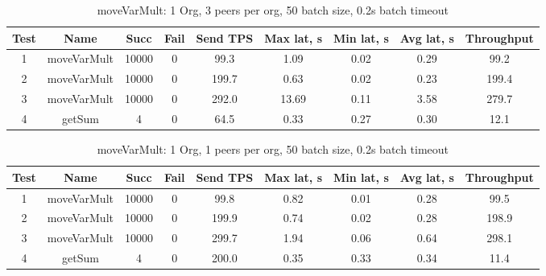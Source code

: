 \begin{appendices}
\begin{table}[H]
\begin{center}
\begin{tabular}{ |c|c|c|c|c|c|c|c|c| }
 \hline
  Test & Name & Succ  & Fail & Send TPS & Max lat, s & Min lat, s & Avg lat, s & Throughput \\
 \hline
 \hline
 1    & moveVarMult & 10000 & 0    & 99.3  & 1.09      & 0.02      & 0.29      & 99.2   \\
 \hline
 2    & moveVarMult & 10000 & 0    & 199.7 & 0.63      & 0.02      & 0.23      & 199.4  \\
 \hline
 3    & moveVarMult & 10000 & 0    & 292.0 & 13.69     & 0.11      & 3.58      & 279.7  \\
 \hline
 4    & getSum      & 4     & 0    & 64.5  & 0.33      & 0.27      & 0.30      & 12.1   \\
 \hline
\end{tabular}
\end{center}
\caption{moveVarMult: 1 Org, 3 peers per org, 50 batch size, 0.2s batch timeout}
\end{table}

\begin{table}[H]
\begin{center}
\begin{tabular}{ |c|c|c|c|c|c|c|c|c| }
 \hline
  Test & Name & Succ  & Fail & Send TPS & Max lat, s & Min lat, s & Avg lat, s & Throughput \\
 \hline
 \hline
 1    & moveVarMult & 10000 & 0    & 99.8  & 0.82      & 0.01      & 0.28      & 99.5   \\
 \hline
 2    & moveVarMult & 10000 & 0    & 199.9 & 0.74      & 0.02      & 0.28      & 198.9  \\
 \hline
 3    & moveVarMult & 10000 & 0    & 299.7 & 1.94      & 0.06      & 0.64      & 298.1  \\
 \hline
 4    & getSum      & 4     & 0    & 200.0 & 0.35      & 0.33      & 0.34      & 11.4   \\
 \hline
\end{tabular}
\end{center}
\caption{moveVarMult: 1 Org, 1 peers per org, 50 batch size, 0.2s batch timeout}
\end{table}

\end{appendices}
